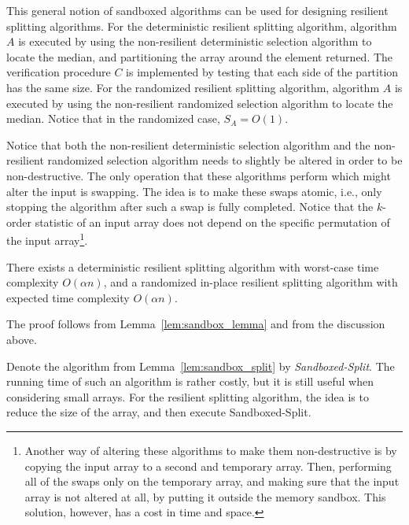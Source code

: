\documentclass{llncs}
\begin{document}
This general notion of sandboxed algorithms can be used for designing resilient splitting algorithms. For the deterministic resilient splitting algorithm, algorithm $A$ is executed by using the non-resilient deterministic selection algorithm to locate the median, and partitioning the array around the element returned. The verification procedure $C$ is implemented by testing that each side of the partition has the same size. For the randomized resilient splitting algorithm, algorithm $A$ is executed by using the non-resilient randomized selection algorithm to locate the median. Notice that in the randomized case, $S_A = O(1)$.

Notice that both the non-resilient deterministic selection algorithm and the non-resilient randomized selection algorithm needs to slightly be altered in order to be non-destructive. The only operation that these algorithms perform which might alter the input is swapping. The idea is to make these swaps atomic, i.e., only stopping the algorithm after such a swap is fully completed. Notice that the $k$-order statistic of an input array does not depend on the specific permutation of the input array\footnote{Another way of altering these algorithms to make them non-destructive is by copying the input array to a second and temporary array. Then, performing all of the swaps only on the temporary array, and making sure that the input array is not altered at all, by putting it outside the memory sandbox. This solution, however, has a cost in time and space.}.

\begin{corollary}\label{lem:sandbox_split}
There exists a deterministic resilient splitting algorithm with worst-case time complexity $O(\alpha n)$, and a randomized in-place resilient splitting algorithm with expected time complexity $O(\alpha n)$.
\end{corollary}

\begin{pf}
The proof follows from Lemma~\ref{lem:sandbox_lemma} and from the discussion above.
\end{pf}


Denote the algorithm from Lemma~\ref{lem:sandbox_split} by \emph{Sandboxed-Split}. The running time of such an algorithm is rather costly, but it is still useful when considering small arrays. For the resilient splitting algorithm, the idea is to reduce the size of the array, and then execute Sandboxed-Split.
\end{document}
